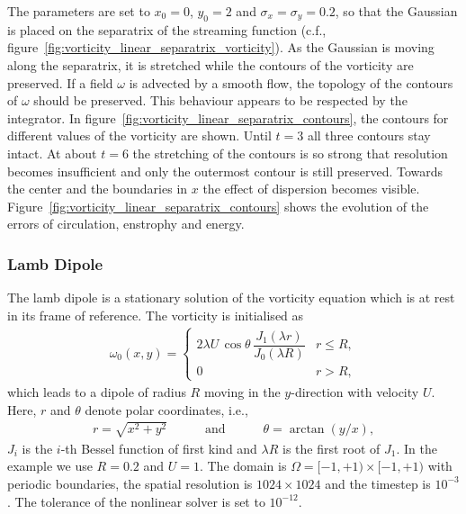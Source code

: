 \documentclass[12pt,a4paper,reqno]{article}
\begin{document}
The parameters are set to $x_{0} = 0$, $y_{0} = 2$ and $\sigma_{x} = \sigma_{y} = 0.2$, so that the Gaussian is placed on the separatrix of the streaming function (c.f., figure~\ref{fig:vorticity_linear_separatrix_vorticity}). As the Gaussian is moving along the separatrix, it is stretched while the contours of the vorticity are preserved. If a field $\omega$ is advected by a smooth flow, the topology of the contours of $\omega$ should be preserved. This behaviour appears to be respected by the integrator. In figure~\ref{fig:vorticity_linear_separatrix_contours}, the contours for different values of the vorticity are shown. Until $t=3$ all three contours stay intact. At about $t=6$ the stretching of the contours is so strong that resolution becomes insufficient and only the outermost contour is still preserved. Towards the center and the boundaries in $x$ the effect of dispersion becomes visible.
Figure~\ref{fig:vorticity_linear_separatrix_contours} shows the evolution of the errors of circulation, enstrophy and energy.

\subsubsection*{Lamb Dipole}

The lamb dipole \cite{NielsenRasmussen:1997} is a stationary solution of the vorticity equation which is at rest in its frame of reference. 
The vorticity is initialised as
\begin{align}
\omega_{0} (x,y) = 
\begin{cases}
2 \lambda U \, \cos \theta \, \dfrac{J_{1} (\lambda r)}{J_{0} (\lambda R)} & r \leq R , \\
0 & r > R ,
\end{cases}
\end{align}
which leads to a dipole of radius $R$ moving in the $y$-direction with velocity $U$.
Here, $r$ and $\theta$ denote polar coordinates, i.e.,
\begin{align}
r = \sqrt{ x^2 + y^2 }
\hspace{3em}
\text{and}
\hspace{3em}
\theta = \arctan (y/x) ,
\end{align}
$J_{i}$ is the $i$-th Bessel function of first kind and $\lambda R$ is the first root of $J_{1}$. In the example we use $R = 0.2$ and $U = 1$. The domain is $\Omega = [-1, +1) \times [-1, +1)$ with periodic boundaries, the spatial resolution is $1024 \times 1024$ and the timestep is $10^{-3}$. The tolerance of the nonlinear solver is set to $10^{-12}$.
\end{document}
